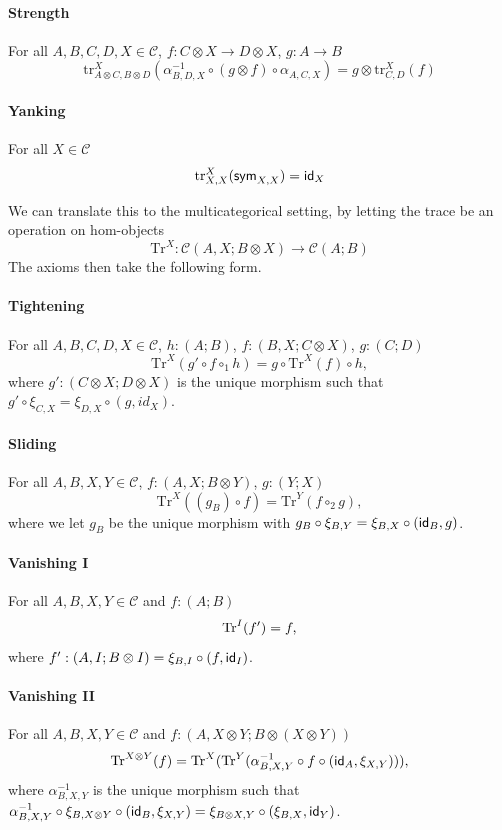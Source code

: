 \begin{example}
\begin{definition}
\paragraph{Strength} For all $A,B,C,D,X \in \mathcal{C}$, $f : C \otimes X \to D \otimes X$, $g : A \to B$
\[
\text{tr}_{A \otimes C,B \otimes D}^{X}(\alpha^{-1}_{B,D,X} \circ (g \otimes f) \circ \alpha_{A,C,X}) = g \otimes \text{tr}_{C,D}^{X}(f)
\]
\paragraph{Yanking} For all $X \in \mathcal{C}$
\[
\text{tr}_{X,X}^{X}(\textsf{sym}_{X,X}) = \textsf{id}_{X}
\]
\end{definition}

We can translate this to the multicategorical setting, by letting the trace be an operation on hom-objects
\[
\text{Tr}^{X} : \mathcal{C}(A,X; B \otimes X) \to \mathcal{C}(A; B)
\]
The axioms then take the following form.
\paragraph{Tightening} For all $A,B,C,D,X \in \mathcal{C}$, $h : (A;B)$, $f : (B,X; C \otimes X)$, $g : (C;D)$
\[
\text{Tr}^{X}(g' \circ f \circ_{1} h) = g \circ \text{Tr}^{X}(f) \circ h,
\]
where $g' : (C \otimes X; D \otimes X)$ is the unique morphism such that $g' \circ \xi_{C,X} = \xi_{D,X} \circ  (g, id_{X})$.
\paragraph{Sliding} For all $A,B,X,Y \in \mathcal{C}$, $f : (A,X;B \otimes Y)$, $g : (Y;X)$
\[
\text{Tr}^{X}((g_{B}) \circ f) = \text{Tr}^{Y}(f \circ_2 g),
\]
where we let $g_{B}$ be the unique morphism with $g_{B} \circ \xi_{B,Y} = \xi_{B,X} \circ (\textsf{id}_{B}, g)$.
\paragraph{Vanishing I} For all $A,B,X,Y \in \mathcal{C}$ and $f : (A;B)$
\[
\text{Tr}^{I}(f') = f,
\]
where $f' : (A,I; B \otimes I) = \xi_{B,I} \circ (f, \textsf{id}_{I})$.

\paragraph{Vanishing II} For all $A,B,X,Y \in \mathcal{C}$ and $f : (A,X \otimes Y;B \otimes (X \otimes Y))$
\[
\text{Tr}^{X \otimes Y}(f) = \text{Tr}^{X}(\text{Tr}^{Y}(\alpha_{B,X,Y}^{-1} \circ f \circ (\textsf{id}_{A}, \xi_{X,Y}))),
\]
where $\alpha_{B,X,Y}^{-1}$ is the unique morphism such that $\alpha_{B,X,Y}^{-1} \circ \xi_{B,X \otimes Y} \circ (\textsf{id}_{B}, \xi_{X,Y}) = \xi_{B \otimes X, Y} \circ (\xi_{B,X}, \textsf{id}_{Y})$. 

\end{example}
